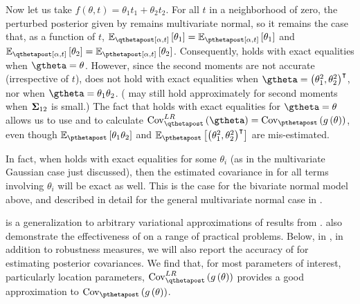 \documentclass{article}\usepackage[]{graphicx}\usepackage[]{color}
\theoremstyle{plain}
\theoremstyle{definition}
\theoremstyle{plain}
\theoremstyle{plain}
\theoremstyle{plain}
\theoremstyle{plain}
\begin{document}
Now let us take $f\left(\theta,t\right)=\theta_{1}t_{1}+\theta_{2}t_{2}$.
For all $t$ in a neighborhood of zero, the perturbed posterior given
by  remains multivariate normal, so it remains
the case that, as a function of $t$, $\mbe_{\qtthetapost}\left[\theta_{1}\right]=\mbe_{\ptthetapost}\left[\theta_{1}\right]$
and $\mbe_{\qtthetapost}\left[\theta_{2}\right]=\mbe_{\ptthetapost}\left[\theta_{2}\right]$.
Consequently,  holds with exact equalities
when $\gtheta=\theta$. However, since the second moments are not
accurate (irrespective of $t$),  does
not hold with exact equalities when $\gtheta=\left(\theta_{1}^{2},\theta_{2}^{2}\right)^{\trans}$,
nor when $\gtheta=\theta_{1}\theta_{2}$. (
may still hold approximately for second moments when $\boldsymbol{\Sigma}_{12}$
is small.) The fact that  holds with
exact equalities for $\gtheta=\theta$ allows us to use 
and  to calculate $\lrvbcov\left(\gtheta\right)=\cov_{\pthetapost}\left(g\left(\theta\right)\right)$,
even though $\mbe_{\pthetapost}\left[\theta_{1}\theta_{2}\right]$
and $\mbe_{\pthetapost}\left[\left(\theta_{1}^{2},\theta_{2}^{2}\right)^{\trans}\right]$
are mis-estimated.

In fact, when  holds with exact equalities
for some $\theta_{i}$ (as in the multivariate Gaussian case just
discussed), then the estimated covariance in 
for all terms involving $\theta_{i}$ will be exact as well. This
is the case for the bivariate normal model above, and described in
detail for the general multivariate normal case in .

 is a generalization to arbitrary
variational approximations of results from \citet{giordano:2015:lrvb}.
\citet{giordano:2015:lrvb} also demonstrate the effectiveness of
 on a range of practical problems.
Below, in , in addition to robustness
measures, we will also report the accuracy of 
for estimating posterior covariances. We find that, for most parameters
of interest, particularly location parameters, $\lrvbcov\left(g\left(\theta\right)\right)$
provides a good approximation to $\cov_{\pthetapost}\left(g\left(\theta\right)\right)$.
\end{document}
